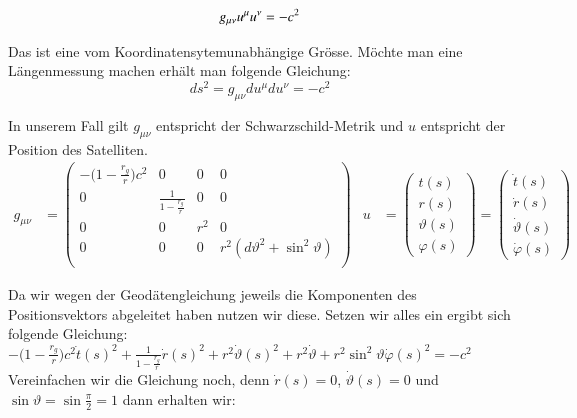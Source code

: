\begin{refsection}
\begin{equation}
g_{\mu\nu}u^\mu u^\nu=-c^2 \\
\end{equation}

\noindent{}Das ist eine vom Koordinatensytemunabhängige Grösse. Möchte man eine Längenmessung machen erhält man folgende Gleichung: \\

\begin{equation}
ds^2 = g_{\mu\nu}du^\mu du^\nu = -c^2
\end{equation}

In unserem Fall gilt \( g_{\mu\nu} \) entspricht der Schwarzschild-Metrik und \( u \) entspricht der Position des Satelliten. \\

\begin{align*}
g_{\mu\nu} &= 
\begin{pmatrix}
-\biggl(1-\frac{r_g}r\biggr)c^2 & 0 & 0 & 0 \\
0 & \frac1{\displaystyle 1-\frac{r_g}r} & 0 & 0 \\
0 & 0 &  r^2 & 0 \\
0 & 0 & 0 &  r^2(d\vartheta^2 + \sin^2\vartheta) \\
\end{pmatrix} &
u &= 
\begin{pmatrix}
t(s) \\
r(s) \\
\vartheta (s) \\
\varphi (s)
\end{pmatrix} = 
\begin{pmatrix}
\dot t(s) \\
\dot r(s) \\
\dot \vartheta (s) \\
\dot \varphi (s)
\end{pmatrix}
\end{align*}

\noindent{}Da wir wegen der Geodätengleichung jeweils die Komponenten des Positionsvektors abgeleitet haben nutzen wir diese. Setzen wir alles ein ergibt sich folgende Gleichung: \\

\( -\biggl(1-\frac{r_g}r\biggr)c^2 \dot t(s)^2 +  \frac1{\displaystyle 1-\frac{r_g}r} \dot r(s)^2 + r^2 \dot \vartheta(s)^2 + r^2 \dot \vartheta + r^2 \sin^2 \vartheta \dot \varphi (s)^2 = -c^2 \) \\

\noindent{}Vereinfachen wir die Gleichung noch, denn \( \dot r(s) = 0 \), \( \dot \vartheta(s) = 0 \) und \( \sin \vartheta = \sin \frac{\pi}{2} = 1 \) dann erhalten wir:


\end{refsection}
